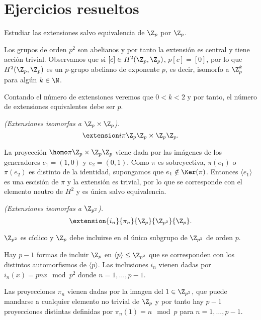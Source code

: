 \chapter{Ejercicios resueltos}

\begin{ejercicio}
	Estudiar las extensiones salvo equivalencia de $\Z_p$ por $\Z_p$. %
	\begin{solucion}
		Los grupos de orden $p^2$ son abelianos y por tanto la extensión es central y tiene acción trivial.
		Observamos que si $[c]\in H^2(\Z_p,\Z_p)$, $p[c] = [0]$, por lo que $H^2(\Z_p,\Z_p)$ es un $p$-grupo abeliano de exponente $p$, es decir, isomorfo a $\Z_p^k$ para algún $k\in \N$.
		
		Contando el número de extensiones veremos que $0<k<2$ y por tanto, el número de extensiones equivalentes debe ser $p$.
		
		\textit{(Extensiones isomorfas a $\Z_p\times \Z_p$).}
		\begin{equation*}
			\extension i \pi {\Z_p} {\Z_p\times \Z_p} {\Z_p}.
		\end{equation*}
		
		La proyección $\homo \pi {\Z_p\times \Z_p} {\Z_p}$ viene dada por las imágenes de los generadores $e_1=(1,0)$ y $e_2=(0,1)$. Como $\pi$ es sobreyectiva, $\pi(e_1)$ o $\pi(e_2)$ es distinto de la identidad, supongamos que $e_1\notin \Ker(\pi)$. Entonces $\langle e_1 \rangle$ es una escisión de $\pi$ y la extensión es trivial, por lo que se corresponde con el elemento neutro de $H^2$ y es única salvo equivalencia.
		
		\textit{(Extensiones isomorfas a $\Z_{p^2}$).}
		\begin{equation*}
			\extension {i_n} {\pi_n} {\Z_p} {\Z_{p^2}} {\Z_p}.
		\end{equation*}
		
		$\Z_{p^2}$ es cíclico y $\Z_p$ debe incluirse en el único subgrupo de $\Z_{p^2}$ de orden $p$. 
		
		Hay $p-1$ formas de incluir $\Z_p$ en $\langle p \rangle \leq \Z_{p^2}$ que se corresponden con los distintos automorfismos de $\langle p \rangle$. Las inclusiones $i_n$ vienen dadas por $i_n(x) = pnx \mod p^2$ donde $n=1,\ldots,p-1$.
		
		Las proyecciones $\pi_n$ vienen dadas por la imagen del $1\in \Z_{p^2}$, que puede mandarse a cualquier elemento no trivial de $\Z_p$ y por tanto hay $p-1$ proyecciones distintas definidas por $\pi_n(1) = n \mod p$ para $n=1,\ldots, p-1$.
		

\end{solucion}
\end{ejercicio}

